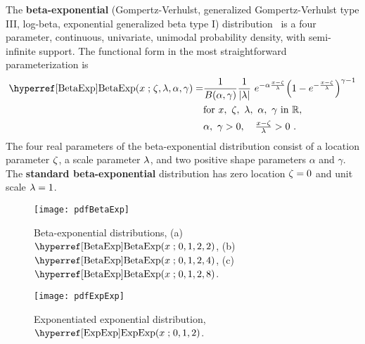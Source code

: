 

\label{sec:BetaExp}

{}
{}
The {\bf beta-exponential} (Gompertz-Verhulst, generalized Gompertz-Verhulst type III, 
log-beta, exponential generalized beta type I) distribution~\cite{Ahuja1967,Nadarajah2006, Iyer-Biswas2014a} is a four parameter, continuous, univariate, unimodal probability density, with  semi-infinite  support. The functional form in the most straightforward parameterization is
\begin{align}
\label{BetaExp}
\opr{BetaExp}(x\given \pLoc,\pScale,\alpha, \gamma) =&
 \frac{1}{B(\alpha, \gamma)} \frac{1}{|\pScale|}\
 e^{-\alpha \frac{x-\pLoc}{\pScale} }  \Left(1 - e^{-\frac{x-\pLoc}{\pScale}  }\Right)^{\gamma-1} 
 \checked
 \\ \notag
 & \text{for } x,\ \pLoc,\ \pScale,\ \alpha,\  \gamma \text{ in } \mathbb{R}, \checked
 \\ \notag & \alpha,\ \gamma >0,\quad  \tfrac{x-\pLoc}{\pScale} >0 \ .\checked
\end{align}
The four real parameters of the beta-exponential  distribution consist of a location parameter $\zeta$, a scale parameter $\lambda$, and two positive shape parameters $\alpha$ and $\gamma$. The {\bf standard beta-exponential} distribution has zero location $\zeta=0$ and unit scale $\lambda=1$.


\begin{figure}[p]
\begin{center}
\texttt{[image: pdfBetaExp]}
\end{center}
\caption[Beta-exponential distributions]{Beta-exponential distributions, (a) $\opr{BetaExp}(x\given 0,1,2, 2)$,
(b) $\opr{BetaExp}(x\given 0, 1, 2, 4)$,
(c) $\opr{BetaExp}(x\given 0, 1, 2, 8)$.
}
\end{figure}

\begin{figure}[p]
\begin{center}
\texttt{[image: pdfExpExp]}
\end{center}
\caption[Exponentiated exponential distribution]{Exponentiated exponential distribution, $\opr{ExpExp}(x\given 0,1,2)$.
}
\end{figure}


